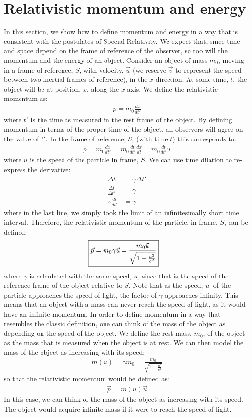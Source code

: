 \section{Relativistic momentum and energy}
In this section, we show how to define momentum and energy in a way that is consistent with the postulates of Special Relativity. We expect that, since time and space depend on the frame of reference of the observer, so too will the momentum and the energy of an object. Consider an object of mass $m_0$, moving in a frame of reference, $S$, with velocity, $\vec u$ (we reserve $\vec v$ to represent the speed between two inertial frames of reference), in the $x$ direction. At some time, $t$, the object will be at position, $x$, along the $x$ axis. We define the relativistic momentum as:
\begin{align*}
p = m_0\frac{dx}{dt'}
\end{align*}
where $t'$ is the time as measured in the rest frame of the object. By defining momentum in terms of the proper time of the object, all observers will agree on the value of $t'$. In the frame of reference, $S$, (with time $t$) this corresponds to:
\begin{align*}
p = m_0\frac{dx}{dt'}=m_0\frac{dt}{dt'}\frac{dx}{dt}=m_0\frac{dt}{dt'}u
\end{align*}
where $u$ is the speed of the particle in frame, $S$. We can use time dilation to re-express the derivative:
\begin{align*}
\Delta t &= \gamma \Delta t'\\
\frac{\Delta t}{\Delta t'}&=\gamma\\
\therefore \frac{dt}{dt'}&=\gamma
\end{align*}
where in the last line, we simply took the limit of an infinitesimally short time interval. Therefore, the relativistic momentum of the particle, in frame, $S$, can be defined:
\begin{align*}
\Aboxed{\vec p = m_0\gamma\vec u =  \frac{m_0\vec u}{\sqrt{1-\frac{u^2}{c^2}}} }
\end{align*}
where $\gamma$ is calculated with the same speed, $u$, since that is the speed of the reference frame of the object relative to $S$. Note that as the speed, $u$, of the particle approaches the speed of light, the factor of $\gamma$ approaches infinity. This means that an object with a mass can never reach the speed of light, as it would have an infinite momentum. In order to define momentum in a way that resembles the classic definition, one can think of the mass of the object as depending on the speed of the object. We define the rest-mass, $m_0$, of the object as the mass that is measured when the object is at rest. We can then model the mass of the object as increasing with its speed:
\begin{align*}
m(u) = \gamma m_0 = \frac{m_0}{\sqrt{1-\frac{u^2}{c^2}}}
\end{align*}
so that the relativistic momentum would be defined as:
\begin{align*}
\vec p = m(u)\vec u
\end{align*}
In this case, we can think of the mass of the object as increasing with its speed. The object would acquire infinite mass if it were to reach the speed of light.

